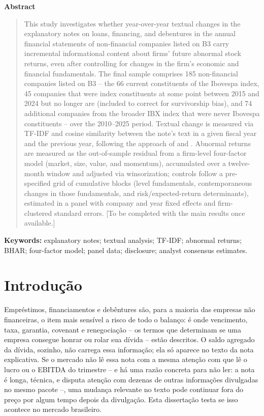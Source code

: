 \documentclass[a4paper,12pt]{report}
\renewenvironment{abstract}{
    \begin{center}
        \textbf{\abstractname}
    \end{center}
    \begin{quote}
}{\end{quote}}
\begin{document}
\renewcommand{\abstractname}{Abstract}
\begin{abstract}
    This study investigates whether year-over-year textual changes in the explanatory notes on loans, financing, and debentures in the annual financial statements of non-financial companies listed on B3 carry incremental informational content about firms' future abnormal stock returns, even after controlling for changes in the firm's economic and financial fundamentals. The final sample comprises 185 non-financial companies listed on B3 -- the 66 current constituents of the Ibovespa index, 45 companies that were index constituents at some point between 2015 and 2024 but no longer are (included to correct for survivorship bias), and 74 additional companies from the broader IBX index that were never Ibovespa constituents -- over the 2010--2025 period. Textual change is measured via TF-IDF and cosine similarity between the note's text in a given fiscal year and the previous year, following the approach of  and . Abnormal returns are measured as the out-of-sample residual from a firm-level four-factor model (market, size, value, and momentum), accumulated over a twelve-month window and adjusted via winsorization; controls follow a pre-specified grid of cumulative blocks (level fundamentals, contemporaneous changes in those fundamentals, and risk/expected-return determinants), estimated in a panel with company and year fixed effects and firm-clustered standard errors. [To be completed with the main results once available.]
\end{abstract}

\noindent
\textbf{Keywords:} explanatory notes; textual analysis; TF-IDF; abnormal returns; BHAR; four-factor model; panel data; disclosure; analyst consensus estimates.
\thispagestyle{empty}
\newpage

\tableofcontents
\thispagestyle{empty}
\newpage

\chapter{Introdução}

Empréstimos, financiamentos e debêntures são, para a maioria das empresas não financeiras, o item mais sensível a risco de todo o balanço: é onde vencimento, taxa, garantia, covenant e renegociação -- os termos que determinam se uma empresa consegue honrar ou rolar sua dívida -- estão descritos. O saldo agregado da dívida, sozinho, não carrega essa informação; ela só aparece no texto da nota explicativa. Se o mercado não lê essa nota com a mesma atenção com que lê o lucro ou o EBITDA do trimestre -- e há uma razão concreta para não ler: a nota é longa, técnica, e disputa atenção com dezenas de outras informações divulgadas no mesmo pacote --, uma mudança relevante no texto pode continuar fora do preço por algum tempo depois da divulgação. Esta dissertação testa se isso acontece no mercado brasileiro.
\end{document}
